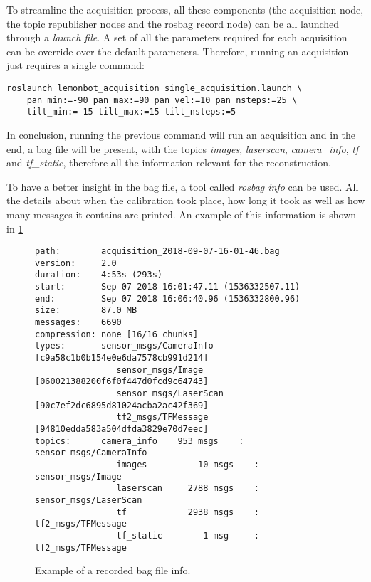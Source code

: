 To streamline the acquisition process, all these components (the acquisition node, the topic republisher nodes and the rosbag record node) can be all launched through a \emph{launch file}. A set of all the parameters required for each acquisition can be override over the default parameters. Therefore, running an acquisition just requires a single command:

\begin{verbatim}
roslaunch lemonbot_acquisition single_acquisition.launch \
    pan_min:=-90 pan_max:=90 pan_vel:=10 pan_nsteps:=25 \
    tilt_min:=-15 tilt_max:=15 tilt_nsteps:=5
\end{verbatim}

In conclusion, running the previous command will run an acquisition and in the end, a bag file will be present, with the topics \emph{images}, \emph{laserscan}, \emph{camera\_info}, \emph{tf} and \emph{tf\_static}, therefore all the information relevant for the reconstruction.

To have a better insight in the bag file, a tool called \emph{rosbag info} can be used. All the details about when the calibration took place, how long it took as well as how many messages it contains are printed. An example of this information is shown in \cref{figure:bag-file-example}

\begin{figure}
    
    \begin{Verbatim}[frame=single, fontsize=\small]
path:        acquisition_2018-09-07-16-01-46.bag
version:     2.0
duration:    4:53s (293s)
start:       Sep 07 2018 16:01:47.11 (1536332507.11)
end:         Sep 07 2018 16:06:40.96 (1536332800.96)
size:        87.0 MB
messages:    6690
compression: none [16/16 chunks]
types:       sensor_msgs/CameraInfo [c9a58c1b0b154e0e6da7578cb991d214]
                sensor_msgs/Image      [060021388200f6f0f447d0fcd9c64743]
                sensor_msgs/LaserScan  [90c7ef2dc6895d81024acba2ac42f369]
                tf2_msgs/TFMessage     [94810edda583a504dfda3829e70d7eec]
topics:      camera_info    953 msgs    : sensor_msgs/CameraInfo
                images          10 msgs    : sensor_msgs/Image     
                laserscan     2788 msgs    : sensor_msgs/LaserScan 
                tf            2938 msgs    : tf2_msgs/TFMessage    
                tf_static        1 msg     : tf2_msgs/TFMessage
    \end{Verbatim}

    \caption{Example of a recorded bag file info.}
    \label{figure:bag-file-example}
\end{figure}

